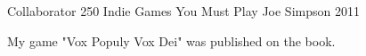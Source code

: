 

\begin{cventries}

  \cventry
    {Collaborator} %
    {250 Indie Games You Must Play} %
    {Joe Simpson} %
    {2011} %
    {
      \begin{cvitems} %
        \item {My game "Vox Populy Vox Dei" was published on the book.}
      \end{cvitems}
    }

\end{cventries}
